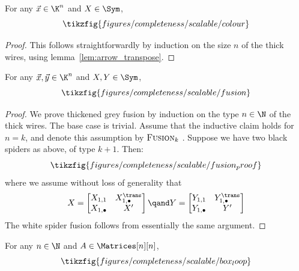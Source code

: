 \begin{lemma}
  \label{lem:scalable_colour}
  For any \(\vec{x} \in \K^n\) and \(X \in \Sym\),
  \begin{equation*}
    \tikzfig{figures/completeness/scalable/colour}
  \end{equation*}
\end{lemma}
\begin{proof}
  This follows straightforwardly by induction on the size \(n\) of the thick
  wires, using lemma~\ref{lem:arrow_transpose}.
\end{proof}
\begin{lemma}
  \label{lem:scalable_fusion}
  For any \(\vec{x},\vec{y} \in \K^n\) and \(X,Y \in \Sym\),
  \begin{equation*}
    \tikzfig{figures/completeness/scalable/fusion}
  \end{equation*}
\end{lemma}
\begin{proof}
  We prove thickened grey fusion by induction on the type \(n\in\N\) of the thick wires. The base case is trivial. Assume that the inductive claim holds for \(n=k\), and denote this assumption by  \(\textsc{Fusion}_k\) .
  Suppose we have two black spiders as above, of type \(k+1\). Then:
  \begin{equation}
    \tikzfig{figures/completeness/scalable/fusion_proof}
  \end{equation}
  where we assume without loss of generality that
  \begin{equation}
    X = \begin{bmatrix} X_{1,1} & X_{1,\bullet}^\trans \\ X_{1,\bullet} & X' \end{bmatrix}
    \qand
    Y = \begin{bmatrix} Y_{1,1} & Y_{1,\bullet}^\trans \\ Y_{1,\bullet} & Y' \end{bmatrix}
  \end{equation}
The white spider fusion follows from essentially the same argument.
\end{proof}
\begin{lemma}
  \label{lem:scalable_box_loop}
  For any \(n \in \N\) and \(A \in \Matrices[n][n]\),
  \begin{equation*}
    \tikzfig{figures/completeness/scalable/box_loop}
  \end{equation*}
\end{lemma}
